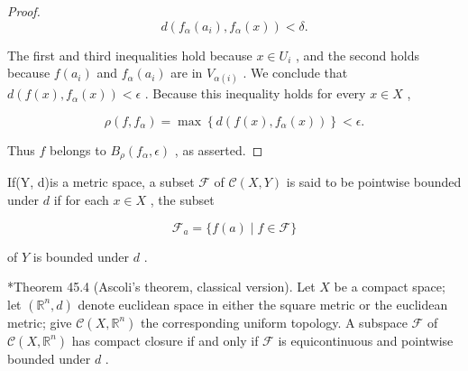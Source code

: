 \begin{proof}
\[
d\left( {{f}_{\alpha }\left( {a}_{i}\right) ,{f}_{\alpha }\left( x\right) }\right)  < \delta .
\]

The first and third inequalities hold because \(x \in  {U}_{i}\) , and the second holds because \(f\left( {a}_{i}\right)\) and \({f}_{\alpha }\left( {a}_{i}\right)\) are in \({V}_{\alpha \left( i\right) }\) . We conclude that \(d\left( {f\left( x\right) ,{f}_{\alpha }\left( x\right) }\right)  < \epsilon\) . Because this inequality holds for every \(x \in  X\) ,

\[
\rho \left( {f,{f}_{\alpha }}\right)  = \max \left\{  {d\left( {f\left( x\right) ,{f}_{\alpha }\left( x\right) }\right) }\right\}   < \epsilon .
\]

Thus \(f\) belongs to \({B}_{\rho }\left( {{f}_{\alpha },\epsilon }\right)\) , as asserted.
\end{proof}
\begin{definition} If(Y, d)is a metric space, a subset \(\mathcal{F}\) of \(\mathcal{C}\left( {X,Y}\right)\) is said to be pointwise bounded under \(d\) if for each \(x \in  X\) , the subset

\[
{\mathcal{F}}_{a} = \{ f\left( a\right)  \mid  f \in  \mathcal{F}\}
\]

of \(Y\) is bounded under \(d\) .
\end{definition}

*Theorem 45.4 (Ascoli’s theorem, classical version). Let \(X\) be a compact space; let \(\left( {{\mathbb{R}}^{n},d}\right)\) denote euclidean space in either the square metric or the euclidean metric; give \(\mathcal{C}\left( {X,{\mathbb{R}}^{n}}\right)\) the corresponding uniform topology. A subspace \(\mathcal{F}\) of \(\mathcal{C}\left( {X,{\mathbb{R}}^{n}}\right)\) has compact closure if and only if \(\mathcal{F}\) is equicontinuous and pointwise bounded under \(d\) .


